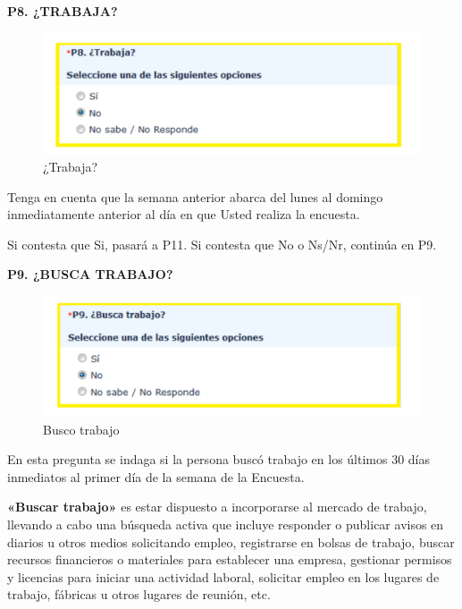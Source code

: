 \documentclass[
  openany]{book}
\begin{document}
\textbf{P8. ¿TRABAJA?}

\begin{figure}

{\centering \includegraphics[width=1\linewidth]{imagenes/figura6-55} 

}

\caption{¿Trabaja?}\label{fig:trabaja1}
\end{figure}

Tenga en cuenta que la semana anterior abarca del lunes al domingo inmediatamente anterior al día en que Usted realiza la encuesta.

Si contesta que Si, pasará a P11. Si contesta que No o Ns/Nr, continúa en P9.

\textbf{P9. ¿BUSCA TRABAJO?}

\begin{figure}

{\centering \includegraphics[width=1\linewidth]{imagenes/figura6-56} 

}

\caption{Busco trabajo}\label{fig:busctrabaja}
\end{figure}

En esta pregunta se indaga si la persona buscó trabajo en los últimos 30 días inmediatos al primer día de la semana de la Encuesta.

\textbf{«Buscar trabajo»} es estar dispuesto a incorporarse al mercado de trabajo, llevando a cabo una búsqueda activa que incluye responder o publicar avisos en diarios u otros medios solicitando empleo, registrarse en bolsas de trabajo, buscar recursos financieros o materiales para establecer una empresa, gestionar permisos y licencias para iniciar una actividad laboral, solicitar empleo en los lugares de trabajo, fábricas u otros lugares de reunión, etc.
\end{document}
